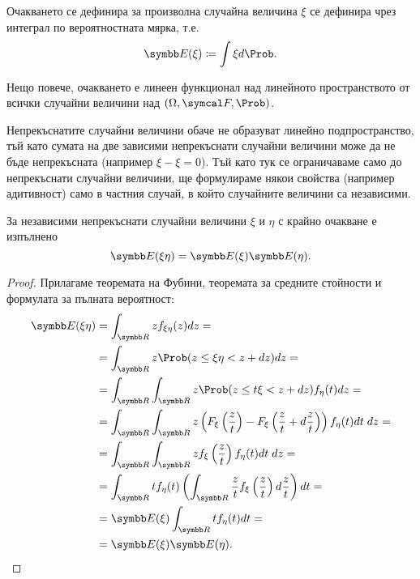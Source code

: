 \documentclass[numbers=endperiod, bibliography=totocnumbered]{scrartcl}
\begin{document}
\begin{remark}
  Очакването се дефинира за произволна случайна величина \( \xi \) се дефинира чрез интеграл по вероятностната мярка, т.е.
  \begin{equation*}
    \Expect(\xi) \coloneqq \int \xi d\Prob.
  \end{equation*}

  Нещо повече, очакването е линеен функционал над линейното пространството от всички случайни величини над \( (\Omega, \F, \Prob) \).

  Непрекъснатите случайни величини обаче не образуват линейно подпространство, тъй като сумата на две зависими непрекъснати случайни величини може да не бъде непрекъсната (например \( \xi - \xi = 0 \)). Тъй като тук се ограничаваме само до непрекъснати случайни величини, ще формулираме някои свойства (например адитивност) само в частния случай, в който случайните величини са независими.
\end{remark}

\begin{proposition}\label{thm:expectation_of_independent_product}
  За независими непрекъснати случайни величини \( \xi \) и \( \eta \) с крайно очакване е изпълнено
  \begin{equation*}
    \Expect(\xi \eta) = \Expect(\xi) \Expect(\eta).
  \end{equation*}
\end{proposition}
\begin{proof}
  Прилагаме теоремата на Фубини, теоремата за средните стойности и формулата за пълната вероятност:
  \begin{align*}
    \Expect(\xi \eta)
    &=
    \int_{\R} z f_{\xi \eta}(z) dz
    = \\ &=
    \int_{\R} z \Prob(z \leq \xi \eta < z + dz) dz
    = \\ &=
    \int_{\R} \int_{\R} z \Prob(z \leq t \xi < z + dz) f_\eta(t) dz
    = \\ &=
    \int_{\R} \int_{\R} z \left( F_\xi\left(\frac z t \right) - F_\xi\left(\frac z t + d\frac z t \right) \right) f_\eta(t) dt \; dz
    = \\ &=
    \int_{\R} \int_{\R} z f_\xi \left(\frac z t \right) f_\eta(t) dt \; dz
    = \\ &=
    \int_{\R} t f_\eta(t) \left(\int_{\R} \frac z t f_\xi \left(\frac z t \right) d\frac z t \right) dt
    = \\ &=
    \Expect(\xi) \int_{\R} t f_\eta(t) dt
    = \\ &=
    \Expect(\xi) \Expect(\eta).
  \end{align*}
\end{proof}
\end{document}
